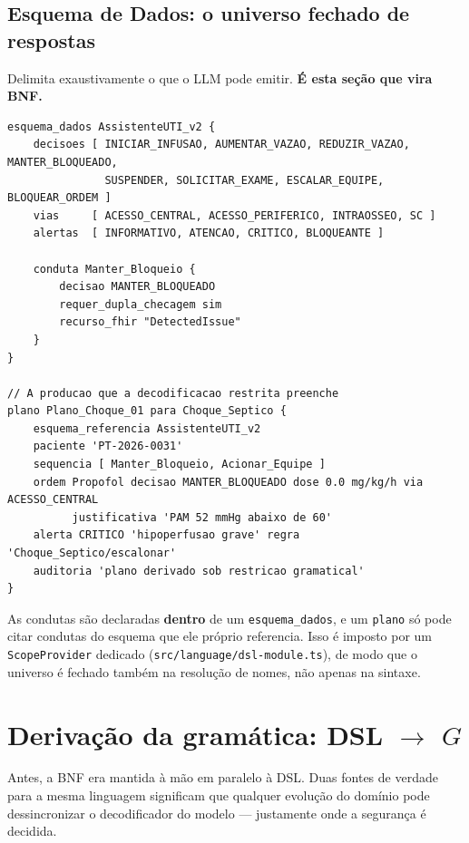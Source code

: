 \documentclass[11pt,a4paper]{article}
\newcommand{\arq}[1]{\texttt{\small #1}}
\begin{document}
\subsection{Esquema de Dados: o universo fechado de respostas}

Delimita exaustivamente o que o LLM pode emitir. \textbf{É esta seção que vira
BNF.}

\begin{lstlisting}[language=dsl]
esquema_dados AssistenteUTI_v2 {
    decisoes [ INICIAR_INFUSAO, AUMENTAR_VAZAO, REDUZIR_VAZAO, MANTER_BLOQUEADO,
               SUSPENDER, SOLICITAR_EXAME, ESCALAR_EQUIPE, BLOQUEAR_ORDEM ]
    vias     [ ACESSO_CENTRAL, ACESSO_PERIFERICO, INTRAOSSEO, SC ]
    alertas  [ INFORMATIVO, ATENCAO, CRITICO, BLOQUEANTE ]

    conduta Manter_Bloqueio {
        decisao MANTER_BLOQUEADO
        requer_dupla_checagem sim
        recurso_fhir "DetectedIssue"
    }
}

// A producao que a decodificacao restrita preenche
plano Plano_Choque_01 para Choque_Septico {
    esquema_referencia AssistenteUTI_v2
    paciente 'PT-2026-0031'
    sequencia [ Manter_Bloqueio, Acionar_Equipe ]
    ordem Propofol decisao MANTER_BLOQUEADO dose 0.0 mg/kg/h via ACESSO_CENTRAL
          justificativa 'PAM 52 mmHg abaixo de 60'
    alerta CRITICO 'hipoperfusao grave' regra 'Choque_Septico/escalonar'
    auditoria 'plano derivado sob restricao gramatical'
}
\end{lstlisting}

As condutas são declaradas \textbf{dentro} de um \texttt{esquema\_dados}, e um
\texttt{plano} só pode citar condutas do esquema que ele próprio referencia.
Isso é imposto por um \texttt{ScopeProvider} dedicado
(\arq{src/language/dsl-module.ts}), de modo que o universo é fechado também na
resolução de nomes, não apenas na sintaxe.

\section{Derivação da gramática: DSL $\rightarrow$ $G$}

Antes, a BNF era mantida à mão em paralelo à DSL. Duas fontes de verdade para a
mesma linguagem significam que qualquer evolução do domínio pode dessincronizar
o decodificador do modelo --- justamente onde a segurança é decidida.
\end{document}

